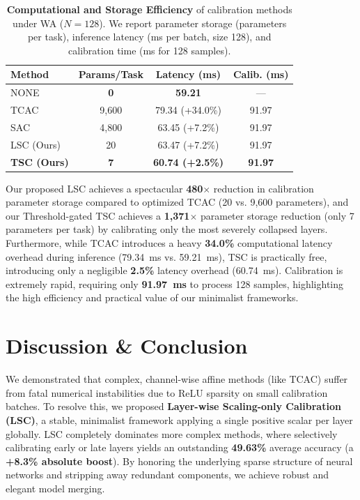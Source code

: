 \documentclass{article}
\theoremstyle{plain}
\theoremstyle{definition}
\theoremstyle{remark}
\begin{document}
\begin{table}[h]
\caption{\textbf{Computational and Storage Efficiency} of calibration methods under WA ($N=128$). We report parameter storage (parameters per task), inference latency (ms per batch, size 128), and calibration time (ms for 128 samples).}
\label{tab:efficiency}
\vskip 0.05in
\begin{center}
\begin{small}
\begin{sc}
\setlength{\tabcolsep}{1.5pt}
\begin{tabular}{lccc}
\toprule
Method & Params/Task & Latency (ms) & Calib. (ms) \\
\midrule
NONE & \textbf{0} & \textbf{59.21} & --- \\
TCAC & 9,600 & 79.34 (+34.0\%) & 91.97 \\
SAC & 4,800 & 63.45 (+7.2\%) & 91.97 \\
LSC (Ours) & 20 & 63.47 (+7.2\%) & 91.97 \\
\textbf{TSC (Ours)} & \textbf{7} & \textbf{60.74 (+2.5\%)} & \textbf{91.97} \\
\bottomrule
\end{tabular}
\end{sc}
\end{small}
\end{center}
\vskip -0.1in
\end{table}

Our proposed LSC achieves a spectacular \textbf{480$\times$} reduction in calibration parameter storage compared to optimized TCAC (20 vs. 9,600 parameters), and our Threshold-gated TSC achieves a \textbf{1,371$\times$} parameter storage reduction (only 7 parameters per task) by calibrating only the most severely collapsed layers. Furthermore, while TCAC introduces a heavy \textbf{34.0\%} computational latency overhead during inference (79.34~ms vs. 59.21~ms), TSC is practically free, introducing only a negligible \textbf{2.5\%} latency overhead (60.74~ms). Calibration is extremely rapid, requiring only \textbf{91.97~ms} to process 128 samples, highlighting the high efficiency and practical value of our minimalist frameworks.

\section{Discussion \& Conclusion}\enlargethispage{2\baselineskip}
\label{sec:conclusion}
We demonstrated that complex, channel-wise affine methods (like TCAC) suffer from fatal numerical instabilities due to ReLU sparsity on small calibration batches. To resolve this, we proposed \textbf{Layer-wise Scaling-only Calibration (LSC)}, a stable, minimalist framework applying a single positive scalar per layer globally. LSC completely dominates more complex methods, where selectively calibrating early or late layers yields an outstanding \textbf{49.63\%} average accuracy (a \textbf{+8.3\% absolute boost}). By honoring the underlying sparse structure of neural networks and stripping away redundant components, we achieve robust and elegant model merging.
\end{document}

